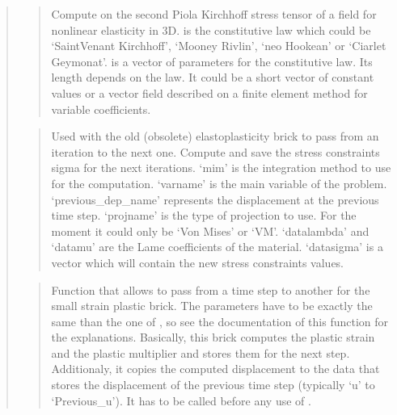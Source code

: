 \documentclass[a4paper,11pt,english]{sphinxmanual}
\begin{document}
\begin{quote}
\begin{quote}

Compute on  the second Piola Kirchhoff stress tensor of a field
for nonlinear elasticity in 3D.  is the constitutive law which
could be ‘SaintVenant Kirchhoff’, ‘Mooney Rivlin’, ‘neo Hookean’ or
‘Ciarlet Geymonat’.
 is a vector of parameters for the constitutive law. Its length
depends on the law. It could be a short vector of constant values or a
vector field described on a finite element method for variable
coefficients.
\end{quote}

\begin{quote}

Used with the old (obsolete) elastoplasticity brick to pass from an
iteration to the next one.
Compute and save the stress constraints sigma for the next iterations.
‘mim’ is the integration method to use for the computation.
‘varname’ is the main variable of the problem.
‘previous\_dep\_name’ represents the displacement at the previous time step.
‘projname’ is the type of projection to use. For the moment it could only be ‘Von Mises’ or ‘VM’.
‘datalambda’ and ‘datamu’ are the Lame coefficients of the material.
‘datasigma’ is a vector which will contain the new stress constraints values.
\end{quote}

\begin{quote}

Function that allows to pass from a time step to another for the
small strain plastic brick. The parameters have to be exactly the
same than the one of ,
so see the documentation of this function for the explanations.
Basically, this brick computes the plastic strain
and the plastic multiplier and stores them for the next step.
Additionaly, it copies the computed displacement to the data
that stores the displacement of the previous time step (typically
‘u’ to ‘Previous\_u’). It has to be called before any use of
.
\end{quote}


\end{quote}
\end{document}
